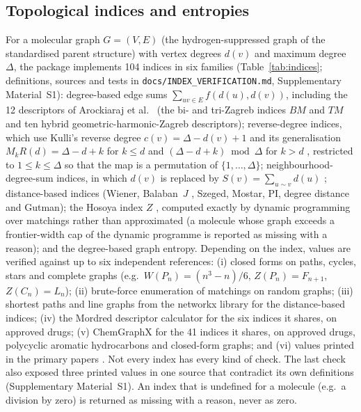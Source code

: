 \documentclass[preprint,12pt]{elsarticle}
\begin{document}
\subsection{Topological indices and entropies}
For a molecular graph $G=(V,E)$ (the hydrogen-suppressed graph of the standardised parent structure) with vertex degrees $d(v)$ and maximum degree $\Delta$, the package implements 104 indices in six families (Table~\ref{tab:indices}; definitions, sources and tests in \texttt{docs/INDEX\_VERIFICATION.md}, Supplementary Material~S1):
degree-based edge sums $\sum_{uv\in E} f(d(u),d(v))$, including the 12 descriptors of Arockiaraj et al.\ \cite{arockiaraj2023hybrid} (the bi- and tri-Zagreb indices $BM$ and $TM$ and ten hybrid geometric-harmonic-Zagreb descriptors);
reverse-degree indices, which use Kulli's reverse degree $c(v)=\Delta-d(v)+1$ \cite{kulli2018} and its generalisation $M_kR(d)=\Delta-d+k$ for $k\le d$ and $(\Delta-d+k)\bmod\Delta$ for $k>d$ \cite{arockiaraj2023ijqc,kalaam2024}, restricted to $1\le k\le\Delta$ so that the map is a permutation of $\{1,\dots,\Delta\}$;
neighbourhood-degree-sum indices, in which $d(v)$ is replaced by $S(v)=\sum_{u\sim v} d(u)$ \cite{mondal2021};
distance-based indices (Wiener, Balaban~$J$ \cite{balaban1982}, Szeged, Mostar, PI, degree distance and Gutman);
the Hosoya index $Z$ \cite{hosoya1971}, computed exactly by dynamic programming over matchings rather than approximated (a molecule whose graph exceeds a frontier-width cap of the dynamic programme is reported as missing with a reason);
and the degree-based graph entropy.
Depending on the index, values are verified against up to six independent references: (i) closed forms on paths, cycles, stars and complete graphs (e.g.\ $W(P_n)=(n^3-n)/6$, $Z(P_n)=F_{n+1}$, $Z(C_n)=L_n$); (ii) brute-force enumeration of matchings on random graphs; (iii) shortest paths and line graphs from the networkx library for the distance-based indices; (iv) the Mordred descriptor calculator \cite{moriwaki2018mordred} for the six indices it shares, on approved drugs; (v) ChemGraphX \cite{jacob2026chemgraphx} for the 41 indices it shares, on approved drugs, polycyclic aromatic hydrocarbons and closed-form graphs; and (vi) values printed in the primary papers \cite{arockiaraj2023ijqc,arockiaraj2023hybrid,godlin2026,arockiaraj2025lung}. Not every index has every kind of check. The last check also exposed three printed values in one source that contradict its own definitions (Supplementary Material~S1).
An index that is undefined for a molecule (e.g.\ a division by zero) is returned as missing with a reason, never as zero.
\end{document}
